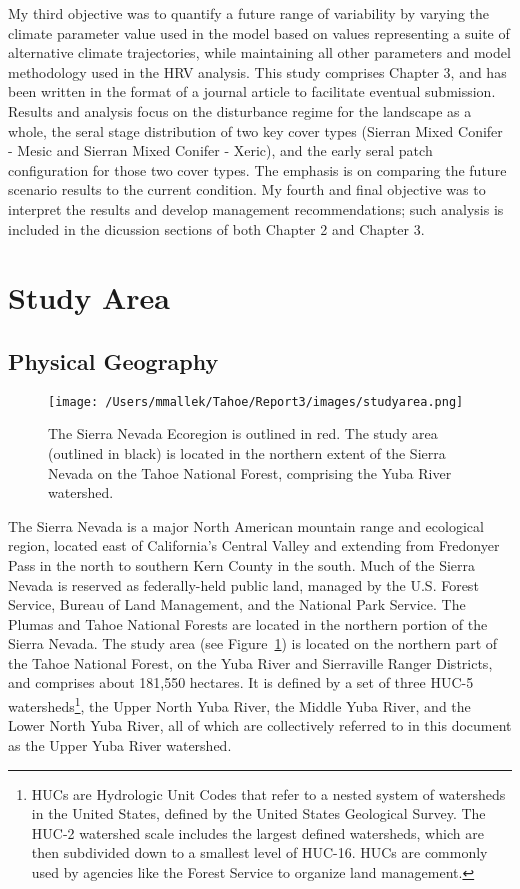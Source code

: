 My third objective was to quantify a future range of variability by varying the climate parameter value used in the model based on values representing a suite of alternative climate trajectories, while maintaining all other parameters and model methodology used in the HRV analysis. This study comprises Chapter 3, and has been written in the format of a journal article to facilitate eventual submission. Results and analysis focus on the disturbance regime for the landscape as a whole, the seral stage distribution of two key cover types (Sierran Mixed Conifer - Mesic and Sierran Mixed Conifer - Xeric), and the early seral patch configuration for those two cover types. The emphasis is on comparing the future scenario results to the current condition. My fourth and final objective was to interpret the results and develop management recommendations; such analysis is included in the dicussion sections of both Chapter 2 and Chapter 3.


\section{Study Area}

\subsection{Physical Geography}

\begin{figure}[!htbp]
\texttt{[image: /Users/mmallek/Tahoe/Report3/images/studyarea.png]}
\caption{The Sierra Nevada Ecoregion is outlined in red. The study area (outlined in black) is located in the northern extent of the Sierra Nevada on the Tahoe National Forest, comprising the Yuba River watershed.}
\label{projectarea}
\end{figure}

The Sierra Nevada is a major North American mountain range and ecological region, located east of California's Central Valley and extending from Fredonyer Pass in the north to southern Kern County in the south. Much of the Sierra Nevada is reserved as federally-held public land, managed by the U.S. Forest Service, Bureau of Land Management, and the National Park Service. The Plumas and Tahoe National Forests are located in the northern portion of the Sierra Nevada. The study area (see Figure~\ref{projectarea}) is located on the northern part of the Tahoe National Forest, on the Yuba River and Sierraville Ranger Districts, and comprises about 181,550 hectares. It is defined by a set of three HUC-5 watersheds\footnote{HUCs are Hydrologic Unit Codes that refer to a nested system of watersheds in the United States, defined by the United States Geological Survey. The HUC-2 watershed scale includes the largest defined watersheds, which are then subdivided down to a smallest level of HUC-16. HUCs are commonly used by agencies like the Forest Service to organize land management.}, the Upper North Yuba River, the Middle Yuba River, and the Lower North Yuba River, all of which are collectively referred to in this document as the Upper Yuba River watershed. 

